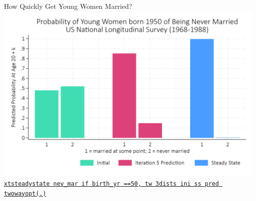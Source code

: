 \documentclass[11pt,table]{beamer}
\begin{document}
%
%
%
%
%

\begin{frame}{How Quickly Get Young Women Married?}
\centering
\includegraphics[width=1\textwidth]{figures/never married.png}
\scriptsize
\href{https://rostam-afschar.de/xtsteadystate/xtsteadystate.htm}{\texttt{xtsteadystate nev\_mar if birth\_yr ==50, tw 3dists ini ss pred twowayopt(.)}}
\end{frame}
\end{document}
